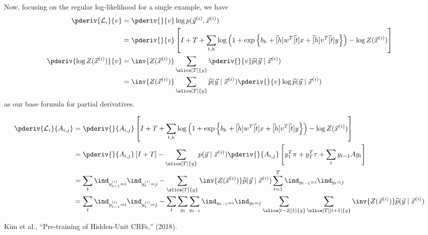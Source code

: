 \documentclass[11pt]{article}
\begin{document}
Now, focusing on the regular log-likelihood for a single example, we have
\begin{align}
\pderiv{\mathcal{L}_i}{v}
&= \pderiv{}{v} \log p(\vec{y}^{(i)}, \vec{x}^{(i)}) \\
&= \pderiv{}{v} \left[ 
I + T + 
\sum_{t, h} \log\left( 1 + \exp\left\{
b_h + \vec[h]{w}^T \vec[t]{x} + \vec[h]{v}^T \vec[t]{y} 
\right\}\right) - 
\log Z(\vec{x}^{(i)})
\right] \\
\pderiv{\log Z(\vec{x}^{(i)})}{v} 
&= \inv{Z(\vec{x}^{(i)})}   \sum_{\slice[T]{y}} \pderiv{}{v} \widetilde{p}(\vec{y} \mid \vec{x}^{(i)}) \\
&= \inv{Z(\vec{x}^{(i)})}   \sum_{\slice[T]{y}} \widetilde{p}(\vec{y} \mid \vec{x}^{(i)}) \pderiv{}{v} \log\widetilde{p}(\vec{y} \mid \vec{x}^{(i)})
\end{align}
as our base formula for partial derivatives. 

\begin{example}
	\begin{align}
	\pderiv{\mathcal{L}_i}{A_{i,j}} 
	&= \pderiv{}{A_{i,j}} \left[ 
	I + T + 
	\sum_{t, h} \log\left( 1 + \exp\left\{
	b_h + \vec[h]{w}^T \vec[t]{x} + \vec[h]{v}^T \vec[t]{y} 
	\right\}\right) - 
	\log Z(\vec{x}^{(i)})
	\right] \\
	&= \pderiv{}{A_{i,j}} \left[ I + T \right]
	- \sum_{\slice[T]{y}}  p(\vec{y} \mid \vec{x}^{(i)}) \pderiv{}{A_{i,j}} \left[ 
	y_1^T \pi + y_T^T \tau + \sum_t y_{t-1}Ay_t \right] \\
	&= \sum_t \ind_{y_{t-1}^{(i)}=i} \ind_{y_{t}^{(i)}=j}
	- \sum_{\slice[T]{y}} \inv{Z(\vec{x}^{(i)})} \widetilde{p}(\vec{y} \mid \vec{x}^{(i)}) \sum_{t=1}^{T} \ind_{y_{t-1}=i} \ind_{y_{t}=j} \\
	&= \sum_t \ind_{y_{t-1}^{(i)}=i} \ind_{y_{t}^{(i)}=j}
	- \sum_t \sum_{y_t} \sum_{y_{t-1}}   \ind_{y_{t-1}=i} \ind_{y_{t}=j} \sum_{ \slice[t-2][1]{y} } \sum_{  \slice[T][t+1]{y}} \inv{Z(\vec{x}^{(i)})} \widetilde{p}(\vec{y} \mid \vec{x}^{(i)})
	\end{align}
\end{example}




\vspace{-1em}
{\footnotesize Kim et al., ``Pre-training of Hidden-Unit CRFs,'' (2018).}
\end{document}
